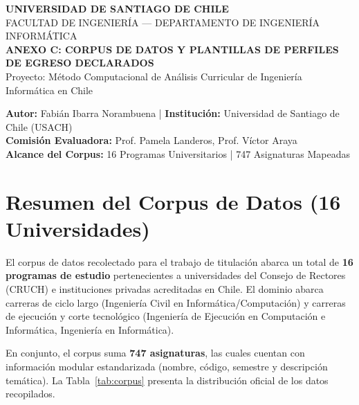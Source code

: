 \documentclass[11pt,a4paper]{article}
\begin{document}
\begin{center}
    {\Large\bfseries\sffamily\color{UsachNavy} UNIVERSIDAD DE SANTIAGO DE CHILE}\\[3pt]
    {\small\sffamily\color{DarkGray} FACULTAD DE INGENIERÍA --- DEPARTAMENTO DE INGENIERÍA INFORMÁTICA}\\[15pt]
    
    {\Large\bfseries\sffamily\color{UsachOrange} ANEXO C: CORPUS DE DATOS Y PLANTILLAS DE PERFILES DE EGRESO DECLARADOS}\\[6pt]
    {\large\sffamily\color{UsachNavy} Proyecto: Método Computacional de Análisis Curricular de Ingeniería Informática en Chile}\\[12pt]
    
    \begin{tcolorbox}[colback=UsachNavy!5,colframe=UsachNavy,arc=4pt,boxrule=0.5pt]
        \centering\small\sffamily
        \textbf{Autor:} Fabián Ibarra Norambuena \quad|\quad 
        \textbf{Institución:} Universidad de Santiago de Chile (USACH)\\[2pt]
        \textbf{Comisión Evaluadora:} Prof. Pamela Landeros, Prof. Víctor Araya\\[2pt]
        \textbf{Alcance del Corpus:} 16 Programas Universitarios | 747 Asignaturas Mapeadas
    \end{tcolorbox}
\end{center}

\vspace{10pt}

\section{\texorpdfstring{\sffamily\color{UsachNavy} Resumen del Corpus de Datos (16 Universidades)}{Resumen del Corpus de Datos (16 Universidades)}}

El corpus de datos recolectado para el trabajo de titulación abarca un total de \textbf{16 programas de estudio} pertenecientes a universidades del Consejo de Rectores (CRUCH) e instituciones privadas acreditadas en Chile. El dominio abarca carreras de ciclo largo (Ingeniería Civil en Informática/Computación) y carreras de ejecución y corte tecnológico (Ingeniería de Ejecución en Computación e Informática, Ingeniería en Informática).

En conjunto, el corpus suma \textbf{747 asignaturas}, las cuales cuentan con información modular estandarizada (nombre, código, semestre y descripción temática). La Tabla~\ref{tab:corpus} presenta la distribución oficial de los datos recopilados.
\end{document}
